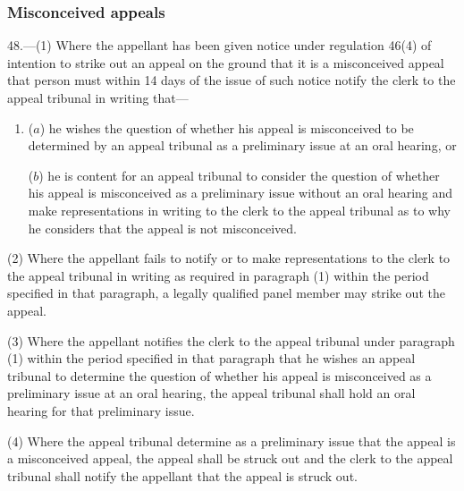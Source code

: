 \documentclass[12pt,a4paper]{article}
\begin{document}

\subsubsection[48. Misconceived appeals]{Misconceived appeals}

48.—(1) Where the appellant has been given notice under regulation 46(4) of intention to strike out an appeal on the ground that it is a misconceived appeal that person must within 14 days of the issue of such notice notify the clerk to the appeal tribunal in writing that—
\begin{enumerate}\item[]
($a$) he wishes the question of whether his appeal is misconceived to be determined by an appeal tribunal as a preliminary issue at an oral hearing, or

($b$) he is content for an appeal tribunal to consider the question of whether his appeal is misconceived as a preliminary issue without an oral hearing and make representations in writing to the clerk to the appeal tribunal as to why he considers that the appeal is not misconceived.
\end{enumerate}

(2) Where the appellant fails to notify or to make representations to the clerk to the appeal tribunal in writing as required in paragraph (1) within the period specified in that paragraph, a legally qualified panel member may strike out the appeal.

(3) Where the appellant notifies the clerk to the appeal tribunal under paragraph (1) within the period specified in that paragraph that he wishes an appeal tribunal to determine the question of whether his appeal is misconceived as a preliminary issue at an oral hearing, the appeal tribunal shall hold an oral hearing for that preliminary issue.

(4) Where the appeal tribunal determine as a preliminary issue that the appeal is a misconceived appeal, the appeal shall be struck out and the clerk to the appeal tribunal shall notify the appellant that the appeal is struck out.
\end{document}

